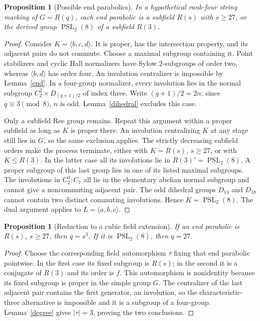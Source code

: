 \documentclass[11pt,a4paper]{article}
\newtheorem{proposition}[lemma]{Proposition}
\newcommand{\gen}[1]{\langle #1\rangle}
\begin{document}
\begin{proposition}[Possible end parabolics]\label{parabolic}
In a hypothetical rank-four string marking of $G=R(q)$, each end
parabolic is a subfield $R(s)$ with $s\ge27$, or the derived group
$\operatorname{PSL}_2(8)$ of a subfield $R(3)$.
\end{proposition}
\begin{proof}
Consider $K=\gen{b,c,d}$. It is proper, has the intersection property,
and its adjacent pairs do not commute. Choose a maximal subgroup
containing it. Point stabilizers and cyclic Hall normalizers have
Sylow $2$-subgroups of order two, whereas $\gen{b,d}$ has order four.
An involution centralizer is impossible by Lemma~\ref{end}.
In a four-group normalizer, every involution lies in the normal
subgroup $C_2^2\times D_{(q+1)/2}$ of index three. Write
$(q+1)/2=2n$; since $q\equiv3\pmod8$, $n$ is odd.
Lemma~\ref{dihedral} excludes this case.

Only a subfield Ree group remains. Repeat this argument within a
proper subfield as long as $K$ is proper there. An involution
centralizing $K$ at any stage still lies in $G$, so the same exclusion
applies. The strictly decreasing subfield orders make the process
terminate, either with $K=R(s)$, $s\ge27$, or with $K\le R(3)$.
In the latter case all its involutions lie in
$R(3)'=\operatorname{PSL}_2(8)$. A proper subgroup of this last group
lies in one of its listed maximal subgroups. The involutions in
$C_2^3:C_7$ all lie in the elementary abelian normal subgroup and
cannot give a noncommuting adjacent pair. The odd dihedral groups
$D_{14}$ and $D_{18}$ cannot contain two distinct commuting
involutions. Hence $K=\operatorname{PSL}_2(8)$. The dual argument
applies to $L=\gen{a,b,c}$.
\end{proof}

\begin{proposition}[Reduction to a cubic field extension]\label{cubic}
If an end parabolic is $R(s)$, $s\ge27$, then $q=s^3$.
If it is $\operatorname{PSL}_2(8)$, then $q=27$.
\end{proposition}
\begin{proof}
Choose the corresponding field automorphism $\tau$ fixing that end
parabolic pointwise. In the first case its fixed subgroup is $R(s)$;
in the second it is a conjugate of $R(3)$ and its order is $f$.
This automorphism is nonidentity because its fixed subgroup is proper
in the simple group $G$. The centralizer of the last adjacent pair
contains the first generator, an involution, so the characteristic-three
alternative is impossible and it is a subgroup of a four-group.
Lemma~\ref{degree} gives $|\tau|=3$, proving the two conclusions.
\end{proof}
\end{document}
